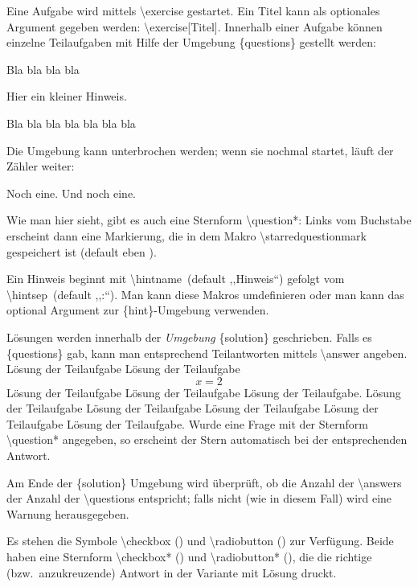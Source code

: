 \documentclass[hyperworksheet]{drcschool}
\newcommand*{\cs}[1]{\textup{\ttfamily\textbackslash#1}}                        %
\newcommand*{\opt}[1]{\textup{\ttfamily#1}}                                     %
\newcommand*{\env}[1]{\textup{\ttfamily\{#1\}}}                                 %
\begin{document}
\begin{worksheet}
\exercise[Titel]\label{ex:foo}
Eine Aufgabe wird mittels \cs{exercise} gestartet.
Ein Titel kann als optionales Argument gegeben werden: \cs{exercise[Titel]}.
Innerhalb einer Aufgabe können einzelne Teilaufgaben mit Hilfe der Umgebung
\env{questions} gestellt werden:
\begin{questions}
\question Bla bla bla bla
\begin{hint}
Hier ein kleiner Hinweis.
\end{hint}
\question Bla bla bla bla bla bla bla
\end{questions}
Die Umgebung kann unterbrochen werden; wenn sie nochmal startet, läuft der Zähler
weiter:
\begin{questions}
\question* Noch eine.
\question Und noch eine.
\end{questions}
Wie man hier sieht, gibt es auch eine Sternform \cs{question*}:
Links vom Buchstabe erscheint dann eine Markierung, die in dem Makro
\cs{starredquestionmark} gespeichert ist (default eben \opt{*}).
\begin{hint}[Aufpassen!]
Ein Hinweis beginnt mit \cs{hintname}~(default ,,Hinweis``) gefolgt vom \cs{hintsep}~(default ,,:``).
Man kann diese Makros umdefinieren oder man kann das optional Argument zur \env{hint}-Umgebung
verwenden.
\end{hint}

\begin{solution}
Lösungen werden innerhalb der \emph{Umgebung} \env{solution} geschrieben.
Falls es \env{questions} gab, kann man entsprechend Teilantworten mittels \cs{answer}
angeben.
\answer Lösung der Teilaufgabe Lösung der Teilaufgabe
\[
x=2
\]
Lösung der Teilaufgabe Lösung der Teilaufgabe Lösung der Teilaufgabe.
\answer Lösung der Teilaufgabe Lösung der Teilaufgabe Lösung der Teilaufgabe Lösung der Teilaufgabe Lösung der Teilaufgabe.
\answer Wurde eine Frage mit der Sternform \cs{question*} angegeben, so erscheint der
Stern automatisch bei der entsprechenden Antwort.

Am Ende der \env{solution} Umgebung wird überprüft, ob die Anzahl der \cs{answer}s
der Anzahl der \cs{question}s entspricht; falls nicht (wie in diesem Fall) wird eine Warnung herausgegeben.
\end{solution}

Es stehen die Symbole \cs{checkbox} (\checkbox) und \cs{radiobutton} (\radiobutton)
zur Verfügung. Beide haben eine Sternform \cs{checkbox*} (\checkbox*) und
\cs{radiobutton*} (\radiobutton*), die die richtige (bzw.~anzukreuzende) Antwort
in der Variante mit Lösung druckt.


\end{worksheet}
\end{document}
